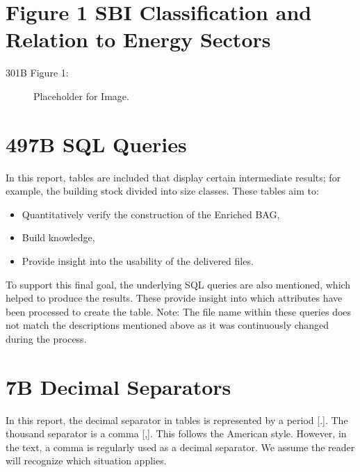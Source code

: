 \documentclass{article}
\begin{document}
\section*{Figure 1 SBI Classification and Relation to Energy Sectors}

\begin{description}
    \item[301B Figure 1:] Placeholder for Image.
\end{description}

\section*{497B SQL Queries}

In this report, tables are included that display certain intermediate results; for example, the building stock divided into size classes. These tables aim to:
\begin{itemize}
    \item Quantitatively verify the construction of the Enriched BAG,
    \item Build knowledge,
    \item Provide insight into the usability of the delivered files.
\end{itemize}

To support this final goal, the underlying SQL queries are also mentioned, which helped to produce the results. These provide insight into which attributes have been processed to create the table. Note: The file name within these queries does not match the descriptions mentioned above as it was continuously changed during the process.

\section*{7B Decimal Separators}

In this report, the decimal separator in tables is represented by a period [.]. The thousand separator is a comma [,]. This follows the American style. However, in the text, a comma is regularly used as a decimal separator. We assume the reader will recognize which situation applies.
\end{document}
